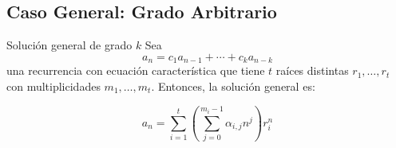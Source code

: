 \subsection{Caso General: Grado Arbitrario}

\begin{thmblock}{Solución general de grado $k$}
Sea
\[
a_n = c_1 a_{n-1} + \cdots + c_k a_{n-k}
\]
una recurrencia con ecuación característica que tiene $t$ raíces distintas $r_1, \dots, r_t$ con multiplicidades $m_1, \dots, m_t$. Entonces, la solución general es:

\[
a_n = \sum_{i=1}^t \left( \sum_{j=0}^{m_i - 1} \alpha_{i,j} n^j \right) r_i^n
\]
\end{thmblock}





